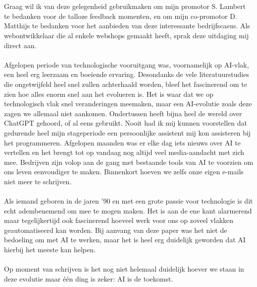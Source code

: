 
\chapter*{}%
\label{ch:voorwoord}

Graag wil ik van deze gelegenheid gebruikmaken om mijn promotor S. Lambert te bedanken voor de talloze feedback momenten, en om mijn co-promotor D. Matthijs te bedanken voor het aanbieden van deze interessante bedrijfscasus. Als webontwikkelaar die al enkele webshops gemaakt heeft, sprak deze uitdaging mij direct aan.
\\\\
Afgelopen periode van technologische vooruitgang was, voornamelijk op AI-vlak, een heel erg leerzaam en boeiende ervaring. Desondanks de vele literatuurstudies die ongetwijfeld heel snel zullen achterhaald worden, bleef het fascinerend om te zien hoe alles enorm snel aan het evolueren is. Het is waar dat we op technologisch vlak snel veranderingen meemaken, maar een AI-evolutie zoals deze zagen we allemaal niet aankomen. Ondertussen heeft bijna heel de wereld over ChatGPT gehoord, of al eens gebruikt. Nooit had ik mij kunnen voorstellen dat gedurende heel mijn stageperiode een persoonlijke assistent mij kon assisteren bij het programmeren. Afgelopen maanden was er elke dag iets nieuws over AI te vertellen en het brengt tot op vandaag nog altijd veel media-aandacht met zich mee. Bedrijven zijn volop aan de gang met bestaande tools van AI te voorzien om ons leven eenvoudiger te maken. Binnenkort hoeven we zelfs onze eigen e-mails niet meer te schrijven.
\\\\
Als iemand geboren in de jaren '90 en met een grote passie voor technologie is dit echt adembenemend om mee te mogen maken. Het is aan de ene kant alarmerend maar tegelijkertijd ook fascinerend hoeveel werk voor ons op zoveel vlakken geautomatiseerd kan worden. Bij aanvang van deze paper was het niet de bedoeling om met AI te werken, maar het is heel erg duidelijk geworden dat AI hierbij het meeste kan helpen.
\\\\
Op moment van schrijven is het nog niet helemaal duidelijk hoever we staan in deze evolutie maar één ding is zeker: AI is de toekomst.